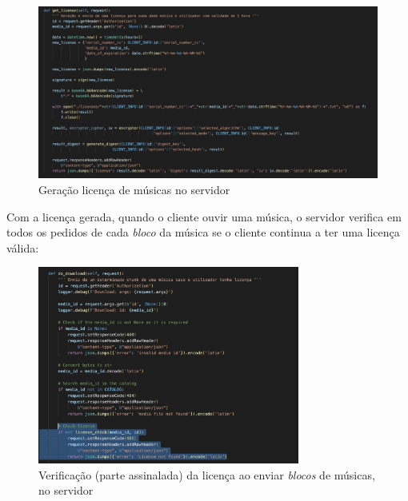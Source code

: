 \documentclass[10pt,english]{article}
\begin{document}
\clearpage

\begin{figure}[!h]
        \centering
        \includegraphics[width=\textwidth]{images/get_license_server.png}
        \caption{Geração licença de músicas no servidor}
\end{figure}

\par Com a licença gerada, quando o cliente ouvir uma música, o servidor verifica em todos os pedidos de cada \textit{bloco} da música se o cliente continua a ter uma licença válida:

\begin{figure}[!h]
        \centering
        \includegraphics[width=325]{images/do_download_license.png}
        \caption{Verificação (parte assinalada) da licença ao enviar \textit{blocos} de músicas, no servidor}
\end{figure}

\clearpage
\end{document}
